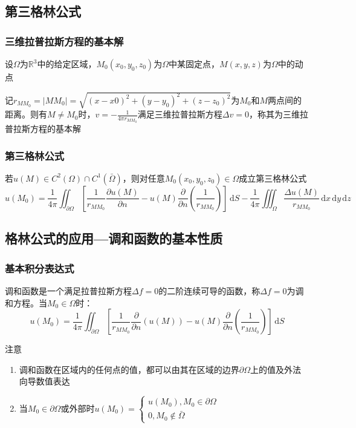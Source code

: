 \subsection{第三格林公式}

\subsubsection{三维拉普拉斯方程的基本解}

设\(\Omega\)为\(\mathbb{R}^3\)中的给定区域，\(M_0(x_0,y_0,z_0)\)为\(\Omega\)中某固定点，\(M(x,y,z)\)为\(\Omega\)中的动点

记\(r_{MM_0}=|MM_0|=\sqrt{(x-x0)^2+(y-y_0)^2+(z-z_0)^2}\)为\(M_0\)和\(M\)两点间的距离。则有\(M\neq M_0\)时，\(v=-\frac{1}{4\pi r_{MM_0}}\)满足三维拉普拉斯方程\(\Delta v=0\)，称其为三维拉普拉斯方程的基本解

\subsubsection{第三格林公式}

若\(u(M)\in C^2(\Omega)\cap C^1(\bar{\Omega})\)，则对任意\(M_0(x_0,y_0,z_0)\in\Omega\)成立第三格林公式
\[
u(M_0)=\frac{1}{4\pi}\iint_{\partial\Omega}\left[\frac{1}{r_{MM_0}}\frac{\partial u(M)}{\partial n}-u(M)\frac{\partial}{\partial n}\left(\frac{1}{r_{MM_0}}\right)\right]\,\mathrm{d}S-\frac{1}{4\pi}\iiint_{\Omega}\frac{\Delta u(M)}{r_{MM_0}}\,\mathrm{d}x\,\mathrm{d}y\,\mathrm{d}z
\]

\subsection{格林公式的应用—调和函数的基本性质}

\subsubsection{基本积分表达式}

调和函数是一个满足拉普拉斯方程\(\Delta f=0\)的二阶连续可导的函数，称\(\Delta f=0\)为调和方程。当\(M_0\in\Omega\)时：
\[
u(M_0)=\frac{1}{4\pi}\iint_{\partial\Omega}\left[\frac{1}{r_{MM_0}}\frac{\partial}{\partial n}(u(M))-u(M)\frac{\partial}{\partial n}\left(\frac{1}{r_{MM_0}}\right)\right]\,\mathrm{d}S
\]

注意
\begin{enumerate}
	\item 调和函数在区域内的任何点的值，都可以由其在区域的边界\(\partial\Omega\)上的值及外法向导数值表达
	\item 当\(M_0\in\partial\Omega\)或外部时\(u(M_0)=\begin{cases}u(M_0),M_0\in\partial\Omega\\0,M_0\notin\bar{\Omega}\end{cases}\)
\end{enumerate}

